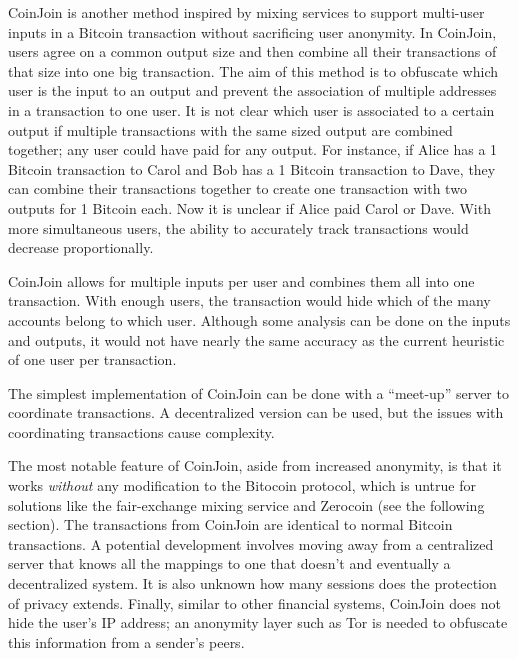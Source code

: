 CoinJoin \cite{coinjoin} is another method inspired by mixing services to support multi-user inputs in a Bitcoin transaction without sacrificing user anonymity. In CoinJoin, users agree on a common output size and then combine all their transactions of that size into one big transaction. The aim of this method is to obfuscate which user is the input to an output and prevent the association of multiple addresses in a transaction to one user. It is not clear which user is associated to a certain output if multiple transactions with the same sized output are combined together; any user could have paid for any output. For instance, if Alice has a 1 Bitcoin transaction to Carol and Bob has a 1 Bitcoin transaction to Dave, they can combine their transactions together to create one transaction with two outputs for 1 Bitcoin each. Now it is unclear if Alice paid Carol or Dave. With more simultaneous users, the ability to accurately track transactions would decrease proportionally.

CoinJoin allows for multiple inputs per user and combines them all into one transaction. With enough users, the transaction would hide which of the many accounts belong to which user. Although some analysis can be done on the inputs and outputs, it would not have nearly the same accuracy as the current heuristic of one user per transaction.

The simplest implementation of CoinJoin can be done with a ``meet-up'' server to coordinate transactions. A decentralized version can be used, but the issues with coordinating transactions cause complexity.

The most notable feature of CoinJoin, aside from increased anonymity, is that it works \emph{without} any modification to the Bitocoin protocol, which is untrue for solutions like the fair-exchange mixing service and Zerocoin (see the following section). The transactions from CoinJoin are identical to normal Bitcoin transactions. A potential development involves moving away from a centralized server that knows all the mappings to one that doesn't and eventually a decentralized system. It is also unknown how many sessions does the protection of privacy extends. Finally, similar to other financial systems, CoinJoin does not hide the user's IP address; an anonymity layer such as Tor is needed to obfuscate this information from a sender's peers.

